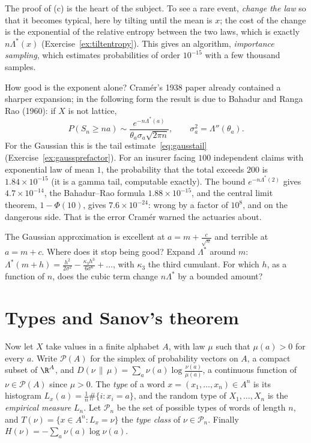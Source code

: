 The proof of (c) is the heart of the subject. To see a rare event, \emph{change the law} so that it becomes typical, here by tilting until the mean is $x$; the cost of the
change is the exponential of the relative entropy between the two laws, which is exactly $n\Lambda^*(x)$ (Exercise~\ref{ex:tiltentropy}). This gives an
algorithm, \emph{importance sampling}, which estimates probabilities of order $10^{-15}$ with a few thousand samples.

How good is the exponent alone? Cram\'er's 1938 paper already contained a sharper expansion; in the following form the result is due to Bahadur and Ranga Rao
(1960): if $X$ is not lattice,
\[
P(S_n\ge na)\sim\frac{e^{-n\Lambda^*(a)}}{\theta_a\sigma_a\sqrt{2\pi n}},\qquad\sigma_a^2=\Lambda''(\theta_a).
\]
For the Gaussian this is the tail estimate~\eqref{eq:gausstail} (Exercise~\ref{ex:gaussprefactor}). For an insurer facing $100$ independent claims with exponential law of mean $1$,
the probability that the total exceeds $200$ is $1.84\times10^{-15}$ (it is a gamma tail, computable exactly). The bound $e^{-n\Lambda^*(2)}$ gives $4.7\times10^{-14}$, the
Bahadur--Rao formula $1.88\times10^{-15}$, and the central limit theorem, $1-\Phi(10)$, gives $7.6\times10^{-24}$: wrong by a factor of $10^8$, and on the dangerous side.
That is the error Cram\'er warned the actuaries about.

\begin{think}
The Gaussian approximation is excellent at $a=m+\frac c{\sqrt n}$ and terrible at $a=m+c$. Where does it stop being good? Expand $\Lambda^*$ around $m$:
$\Lambda^*(m+h)=\frac{h^2}{2\sigma^2}-\frac{\kappa_3h^3}{6\sigma^6}+\dots$, with $\kappa_3$ the third cumulant. For which $h$, as a function of $n$, does the cubic term change $n\Lambda^*$ by
a bounded amount?
\end{think}

\section{Types and Sanov's theorem}

Now let $X$ take values in a finite alphabet $A$, with law $\mu$ such that $\mu(a)>0$ for every $a$. Write $\mathcal P(A)$ for the simplex of probability vectors on $A$, a
compact subset of $\R^A$, and $D(\nu\,\|\,\mu)=\sum_a\nu(a)\log\frac{\nu(a)}{\mu(a)}$, a continuous function of $\nu\in\mathcal P(A)$ since $\mu>0$. The \emph{type} of a word
$x=(x_1,\dots,x_n)\in A^n$ is its histogram $L_x(a)=\frac1n\#\{i:x_i=a\}$, and the random type of $X_1,\dots,X_n$ is the \emph{empirical measure} $L_n$. Let $\mathcal P_n$ be the set of
possible types of words of length $n$, and $T(\nu)=\{x\in A^n:L_x=\nu\}$ the \emph{type class} of $\nu\in\mathcal P_n$. Finally $H(\nu)=-\sum_a\nu(a)\log\nu(a)$.

